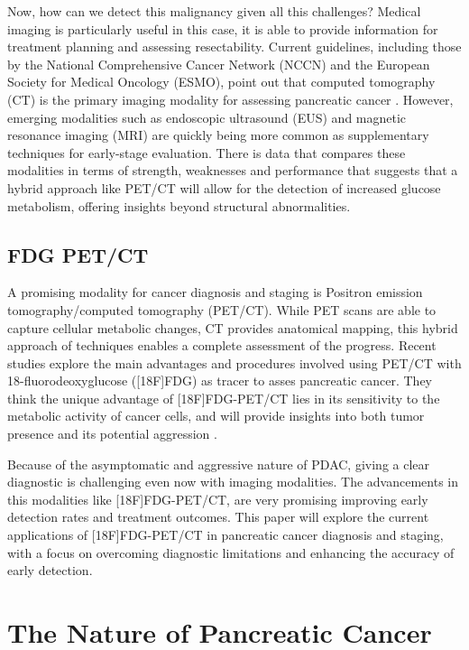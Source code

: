 \documentclass[11pt]{article} %
\begin{document}
Now, how can we detect this malignancy given all this challenges? Medical imaging is particularly useful in this case, it is able to provide information for treatment planning and assessing resectability. Current guidelines, including those by the National Comprehensive Cancer Network (NCCN) and the European Society for Medical Oncology (ESMO), point out that computed tomography (CT) is the primary imaging modality for assessing pancreatic cancer \cite{NCCNGuidelines}. However, emerging modalities such as endoscopic ultrasound (EUS) and magnetic resonance imaging (MRI) are quickly being more common as supplementary techniques for early-stage evaluation. There is data that compares these modalities in terms of strength, weaknesses and performance that suggests that a hybrid approach like PET/CT will allow for the detection of increased glucose metabolism, offering insights beyond structural abnormalities.

\subsection{FDG PET/CT}

A promising modality for cancer diagnosis and staging is Positron emission tomography/computed tomography (PET/CT). While PET scans are able to capture cellular metabolic changes, CT provides anatomical mapping, this hybrid approach of techniques enables a complete assessment of the progress. Recent studies explore the main advantages and procedures involved using PET/CT with 18-fluorodeoxyglucose ([18F]FDG) as tracer to asses pancreatic cancer. They think the unique advantage of [18F]FDG-PET/CT lies in its sensitivity to the metabolic activity of cancer cells, and will provide insights into both tumor presence and its potential aggression \cite{Pu2021}.

Because of the asymptomatic and aggressive nature of PDAC, giving a clear diagnostic is challenging even now with imaging modalities. The advancements in this modalities like [18F]FDG-PET/CT, are very promising improving early detection rates and treatment outcomes. This paper will explore the current applications of [18F]FDG-PET/CT in pancreatic cancer diagnosis and staging, with a focus on overcoming diagnostic limitations and enhancing the accuracy of early detection.

    
\section{The Nature of Pancreatic Cancer}
\end{document}

